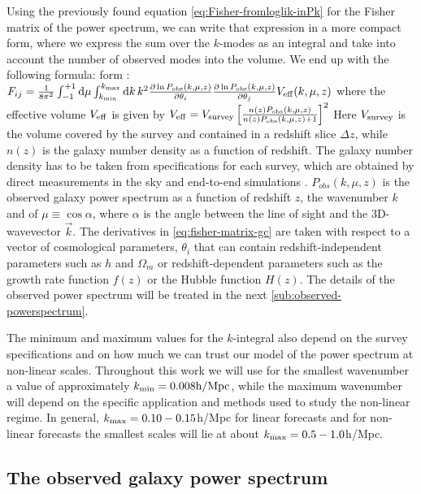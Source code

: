 Using the previously found equation \ref{eq:Fisher-fromloglik-inPk} for the
Fisher matrix of the power spectrum, we can write that expression in a more compact form, where 
we express the sum over the $k$-modes as an integral and take into account the number of observed modes into
the volume. We end up with the following formula:
form \citep{seo_improved_2007, amendola book, dodelson}: 
\beeqc$\label{eq:fisher-matrix-gc}
F_{ij}=\frac{1}{8\pi^{2}}\int_{-1}^{+1}\mbox{d}\mu\int_{k_{\rm min}}^{k_{\rm max}}\mbox{d}k\,k^{2}\frac{\partial\ln
	P_{\mathrm{obs}} (k,\mu,z)}{\partial\theta_{i}}\frac{\partial\ln
	P_{\mathrm{obs}} (k,\mu,z)}{\partial\theta_{j}}V_{\rm eff}(k,\mu,z)
$
where the effective volume $V_{\rm eff}$ is given by
\beeqp$
V_{\rm eff} = V_{\rm survey}\left[\frac{n(z)P_{\mathrm{obs}} (k,\mu,z)}{n(z)P_{\mathrm{obs}} (k,\mu,z)+1}\right]^{2}
$
Here $V_{\rm survey}$
is the volume covered by the survey and contained in a redshift slice
$\Delta z$, while $n(z)$ is the galaxy number density as a function of
redshift. The galaxy number density has to be taken from specifications for each survey, which
are obtained by direct measurements in the sky and end-to-end simulations \cite{Dida, Guzzo, etc}.
$P_{obs}(k,\mu,z)$ is the observed galaxy power
spectrum as a function of redshift $z$, the wavenumber $k$ and
of $\mu\equiv\cos\alpha$, where $\alpha$ is the angle between the
line of sight and the 3D-wavevector $\vec{k}$. 
The derivatives in \cref{eq:fisher-matrix-gc} are taken with
respect to a vector of cosmological parameters, $\theta_{i}$ that can contain
redshift-independent parameters such as $h$ and $\Omega_{m}$ or redshift-dependent
parameters such as the growth rate function $f(z)$ or the Hubble function $H(z)$.
The details of the observed power spectrum will be treated in the next \cref{sub:observed-powerspectrum}.

The minimum and maximum values for the $k$-integral also depend on the survey specifications and
on how much we can trust our model of the power spectrum at non-linear scales. Throughout this work
we will use for
the smallest wavenumber a value of approximately $k_{\rm min}=0.008\textrm{h/Mpc}$, 
while the maximum wavenumber will depend on the specific application and methods used to study the non-linear regime.
In general, $k_{\rm max}={0.10-0.15}$h/Mpc for linear forecasts and for non-linear forecasts 
the smallest scales will lie at about $k_{\rm max}={0.5-1.0}$h/Mpc.
 

\subsection{The observed galaxy power spectrum \label{sub:observed-powerspectrum}}

